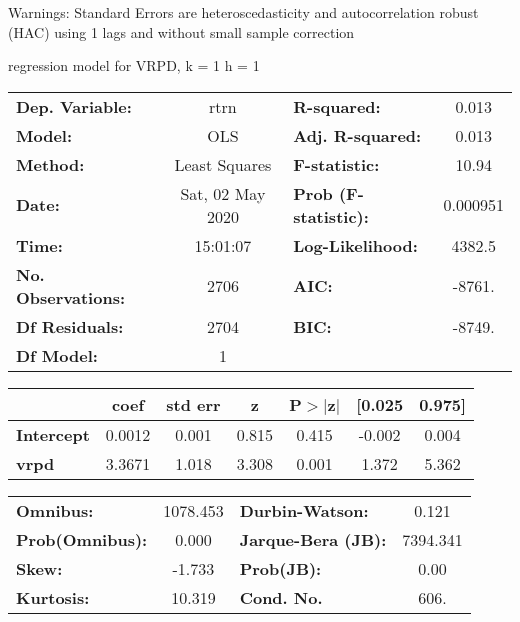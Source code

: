 Warnings: \newline
 [1] Standard Errors are heteroscedasticity and autocorrelation robust (HAC) using 1 lags and without small sample correction\ 

regression model for VRPD, k = 1 h = 1\begin{center}
\begin{tabular}{lclc}
\toprule
\textbf{Dep. Variable:}    &       rtrn       & \textbf{  R-squared:         } &     0.013   \\
\textbf{Model:}            &       OLS        & \textbf{  Adj. R-squared:    } &     0.013   \\
\textbf{Method:}           &  Least Squares   & \textbf{  F-statistic:       } &     10.94   \\
\textbf{Date:}             & Sat, 02 May 2020 & \textbf{  Prob (F-statistic):} &  0.000951   \\
\textbf{Time:}             &     15:01:07     & \textbf{  Log-Likelihood:    } &    4382.5   \\
\textbf{No. Observations:} &        2706      & \textbf{  AIC:               } &    -8761.   \\
\textbf{Df Residuals:}     &        2704      & \textbf{  BIC:               } &    -8749.   \\
\textbf{Df Model:}         &           1      & \textbf{                     } &             \\
\bottomrule
\end{tabular}
\begin{tabular}{lcccccc}
                   & \textbf{coef} & \textbf{std err} & \textbf{z} & \textbf{P$> |$z$|$} & \textbf{[0.025} & \textbf{0.975]}  \\
\midrule
\textbf{Intercept} &       0.0012  &        0.001     &     0.815  &         0.415        &       -0.002    &        0.004     \\
\textbf{vrpd}      &       3.3671  &        1.018     &     3.308  &         0.001        &        1.372    &        5.362     \\
\bottomrule
\end{tabular}
\begin{tabular}{lclc}
\textbf{Omnibus:}       & 1078.453 & \textbf{  Durbin-Watson:     } &    0.121  \\
\textbf{Prob(Omnibus):} &   0.000  & \textbf{  Jarque-Bera (JB):  } & 7394.341  \\
\textbf{Skew:}          &  -1.733  & \textbf{  Prob(JB):          } &     0.00  \\
\textbf{Kurtosis:}      &  10.319  & \textbf{  Cond. No.          } &     606.  \\
\bottomrule
\end{tabular}
\end{center}

